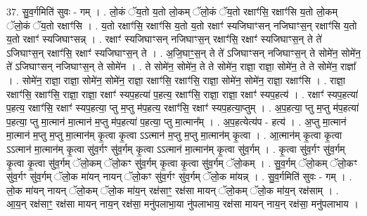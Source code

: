 \documentclass[17pt]{extarticle}
\begin{document}
37. सु॒व॒र्गमिति॑ सुवः - गम् । . लो॒कं ॅय॒तो य॒तो लो॒कम् ॅलो॒कं ॅय॒तो रक्षाꣳ॑सि॒ रक्षाꣳ॑सि य॒तो लो॒कम् ॅलो॒कं ॅय॒तो रक्षाꣳ॑सि । . य॒तो रक्षाꣳ॑सि॒ रक्षाꣳ॑सि य॒तो य॒तो रक्षाꣳ॑ स्यजिघाꣳसन् नजिघाꣳस॒न् रक्षाꣳ॑सि य॒तो य॒तो रक्षाꣳ॑ स्यजिघाꣳसन्न् । . रक्षाꣳ॑ स्यजिघाꣳसन् नजिघाꣳस॒न् रक्षाꣳ॑सि॒ रक्षाꣳ॑ स्यजिघाꣳस॒न् ते ते॑ ऽजिघाꣳस॒न् रक्षाꣳ॑सि॒ रक्षाꣳ॑ स्यजिघाꣳस॒न् ते । . अ॒जि॒घाꣳ॒॒स॒न् ते ते॑ ऽजिघाꣳसन् नजिघाꣳस॒न् ते सोमे॑न॒ सोमे॑न॒ ते॑ ऽजिघाꣳसन् नजिघाꣳस॒न् ते सोमे॑न । . ते सोमे॑न॒ सोमे॑न॒ ते ते सोमे॑न॒ राज्ञा॒ राज्ञा॒ सोमे॑न॒ ते ते सोमे॑न॒ राज्ञा᳚ । . सोमे॑न॒ राज्ञा॒ राज्ञा॒ सोमे॑न॒ सोमे॑न॒ राज्ञा॒ रक्षाꣳ॑सि॒ रक्षाꣳ॑सि॒ राज्ञा॒ सोमे॑न॒ सोमे॑न॒ राज्ञा॒ रक्षाꣳ॑सि । . राज्ञा॒ रक्षाꣳ॑सि॒ रक्षाꣳ॑सि॒ राज्ञा॒ राज्ञा॒ रक्षाꣳ॑ स्यप॒हत्या॑ प॒हत्य॒ रक्षाꣳ॑सि॒ राज्ञा॒ राज्ञा॒ रक्षाꣳ॑ स्यप॒हत्य॑ । . रक्षाꣳ॑ स्यप॒हत्या॑ प॒हत्य॒ रक्षाꣳ॑सि॒ रक्षाꣳ॑ स्यप॒हत्या॒ प्तु म॒प्तु म॑प॒हत्य॒ रक्षाꣳ॑सि॒ रक्षाꣳ॑ स्यप॒हत्या॒प्तुम् । . अ॒प॒हत्या॒ प्तु म॒प्तु म॑प॒हत्या॑ प॒हत्या॒ प्तु मा॒त्मान॑ मा॒त्मान॑ म॒प्तु म॑प॒हत्या॑ प॒हत्या॒ प्तु मा॒त्मान᳚म् । . अ॒प॒हत्येत्य॑प - हत्य॑ । . अ॒प्तु मा॒त्मान॑ मा॒त्मान॑ म॒प्तु म॒प्तु मा॒त्मान॑म् कृ॒त्वा कृ॒त्वा ऽऽत्मान॑ म॒प्तु म॒प्तु मा॒त्मान॑म् कृ॒त्वा । . आ॒त्मान॑म् कृ॒त्वा कृ॒त्वा ऽऽत्मान॑ मा॒त्मान॑म् कृ॒त्वा सु॑व॒र्गꣳ सु॑व॒र्गम् कृ॒त्वा ऽऽत्मान॑ मा॒त्मान॑म् कृ॒त्वा सु॑व॒र्गम् । . कृ॒त्वा सु॑व॒र्गꣳ सु॑व॒र्गम् कृ॒त्वा कृ॒त्वा सु॑व॒र्गम् ॅलो॒कम् ॅलो॒कꣳ सु॑व॒र्गम् कृ॒त्वा कृ॒त्वा सु॑व॒र्गम् ॅलो॒कम् । . सु॒व॒र्गम् ॅलो॒कम् ॅलो॒कꣳ सु॑व॒र्गꣳ सु॑व॒र्गम् ॅलो॒क मा॑यन् नायन् ॅलो॒कꣳ सु॑व॒र्गꣳ सु॑व॒र्गम् ॅलो॒क मा॑यन्न् । . सु॒व॒र्गमिति॑ सुवः - गम् । . लो॒क मा॑यन् नायन् ॅलो॒कम् ॅलो॒क मा॑य॒न् रक्ष॑साꣳ॒॒ रक्ष॑सा मायन् ॅलो॒कम् ॅलो॒क मा॑य॒न् रक्ष॑साम् । . आ॒य॒न् रक्ष॑साꣳ॒॒ रक्ष॑सा मायन् नाय॒न् रक्ष॑सा॒ मनु॑पलाभा॒या नु॑पलाभाय॒ रक्ष॑सा मायन् नाय॒न् रक्ष॑सा॒ मनु॑पलाभाय । \newline
\end{document}
